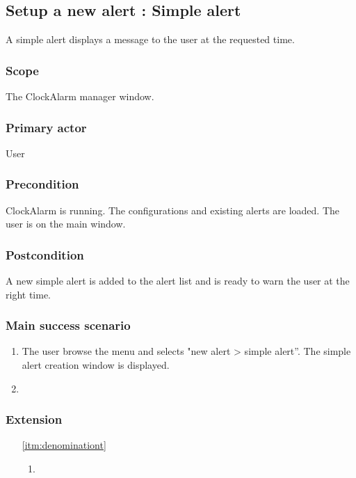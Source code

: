\subsection{Setup a new alert : Simple alert}
A simple alert displays a message to the user at the requested time.
\subsubsection{Scope}
The ClockAlarm manager window.
\subsubsection{Primary actor}
User
\subsubsection{Precondition}
ClockAlarm is running. The configurations and existing alerts are loaded. The user is on the main window.
\subsubsection{Postcondition}
A new simple alert is added to the alert list and is ready to warn the user at the right time.
\subsubsection{Main success scenario}
\begin{enumerate}
	\item The user browse the menu and selects "new alert > simple alert''. The simple alert creation window is displayed.
	\item \label{itm:denomination} 
\end{enumerate}
\subsubsection{Extension}
\begin{enumerate}
	\item[\ref{itm:denominationt}]
	\begin{enumerate}[i]
		\item 
	\end{enumerate}
\end{enumerate}
